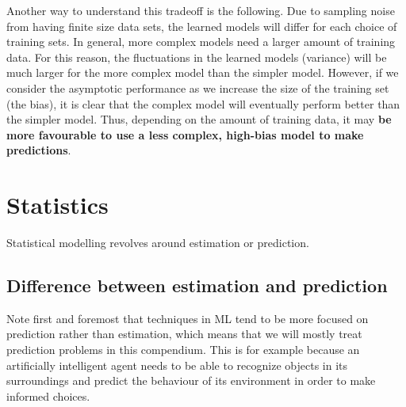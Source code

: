 Another way to understand this tradeoff is the following. Due to sampling noise from having finite size data sets, the learned models will differ for each choice of training sets. In general, more complex models need a larger amount of training data. For this reason, the fluctuations in the learned models (variance) will be much larger for the more complex model than the simpler model. However, if we consider the asymptotic performance as we increase the size of the training set (the bias), it is clear that the complex model will eventually perform better than the simpler model. Thus, depending on the amount of training data, it may \textbf{be more favourable to use a less complex, high-bias model to make predictions}.
























\section{Statistics}
Statistical modelling revolves around estimation or prediction.
\subsection{Difference between estimation and prediction}
Note first and foremost that techniques in ML tend to be more focused on prediction rather than estimation, which means that we will mostly treat prediction problems in this compendium. This is for example because an artificially intelligent agent needs to be able to recognize objects in its surroundings and predict the behaviour of its environment in order to make informed choices.\\
